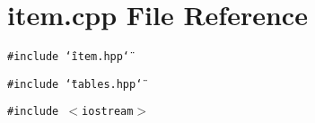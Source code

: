 \section{item.cpp File Reference}
\label{item_8cpp}
{\tt \#include \char`\"{}item.hpp\char`\"{}}\par
{\tt \#include \char`\"{}tables.hpp\char`\"{}}\par
{\tt \#include $<$iostream$>$}\par
